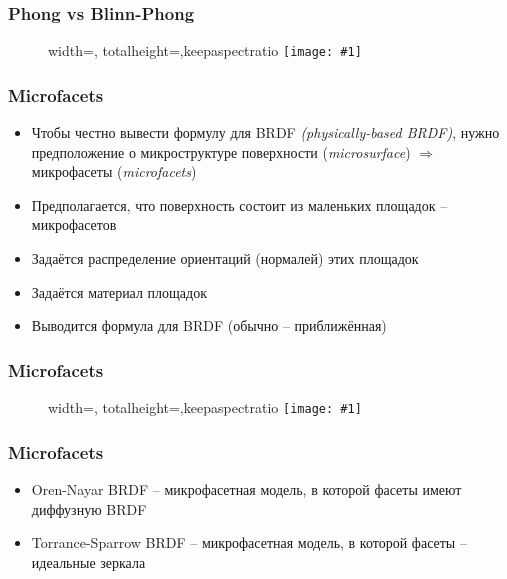 \documentclass{beamer}
\newcommand{\slideimage}[1]{
  \begin{figure}
    \begin{adjustbox}{width=\textwidth, totalheight=\textheight-2\baselineskip-2\baselineskip,keepaspectratio}
      \texttt{[image: \#1]}
    \end{adjustbox}
  \end{figure}
}
\begin{document}
\begin{frame}[fragile]
\frametitle{Phong vs Blinn-Phong}
\slideimage{blinn-phong.png}
\end{frame}

\begin{frame}[fragile]
\frametitle{Microfacets}
\begin{itemize}
\item Чтобы честно вывести формулу для BRDF \textit{(physically-based BRDF)}, нужно предположение о микроструктуре поверхности (\textit{microsurface}) \pause \begin{math}\Rightarrow\end{math} микрофасеты (\textit{microfacets})
\pause
\item Предполагается, что поверхность состоит из маленьких площадок -- микрофасетов
\pause
\item Задаётся распределение ориентаций (нормалей) этих площадок
\pause
\item Задаётся материал площадок
\pause
\item Выводится формула для BRDF (обычно -- приближённая)
\end{itemize}
\end{frame}

\begin{frame}[fragile]
\frametitle{Microfacets}
\slideimage{microfacet.png}
\end{frame}

\begin{frame}[fragile]
\frametitle{Microfacets}
\begin{itemize}
\item Oren-Nayar BRDF -- микрофасетная модель, в которой фасеты имеют диффузную BRDF
\item Torrance-Sparrow BRDF -- микрофасетная модель, в которой фасеты -- идеальные зеркала
\end{itemize}
\end{frame}
\end{document}
